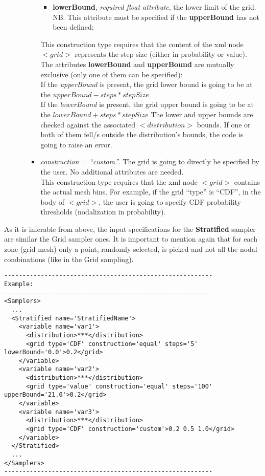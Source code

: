 \begin{itemize}
\begin{itemize}
\begin{itemize}
\begin{itemize}
         \item \textbf{lowerBound}, \textit{required float attribute}, the lower limit of the grid.
        NB. This attribute must be specified if the \textbf{upperBound} has not been defined;
      \end{itemize}
      This construction type requires that the content of the xml node $<grid>$ represents the step size (either in probability or value). The attributes \textbf{lowerBound} and \textbf{upperBound} are mutually exclusive (only one of them can be specified):
      \\ If the \textit{upperBound} is present, the grid lower bound is going to be at the $upperBound - steps*stepSize$
      \\ If the \textit{lowerBound} is present, the grid upper bound is going to be at the $lowerBound + steps*stepSize$
      The lower and upper bounds are checked against the associated $<distribution>$ bounds. If one or both of them fell/s outside the distribution's bounds, the code is going to raise an error.
  \item \textit{construction = ``custom''}. The grid is going to directly be specified by the user. No additional attributes are needed. 
     \\This construction type requires that the xml node $<grid>$  contains the actual mesh bins. For example, if the grid ``type'' is ``CDF'', in the body of $<grid>$, the user is going to specify CDF probability thresholds (nodalization in probability).
\end{itemize}
  \end{itemize}
\end{itemize}
As it is inferable from above, the input specifications for the \textbf{Stratified} sampler are similar the Grid sampler ones. It is important to mention again that for each zone (grid mesh) only a point, randomly selected, is picked and not all the nodal combinations (like in the Grid sampling).

\begin{lstlisting}[style=XML]
---------------------------------------------------------
Example:
---------------------------------------------------------
<Samplers>
  ...
  <Stratified name='StratifiedName'> 
    <variable name='var1'> 
      <distribution>***</distribution>
      <grid	type='CDF' construction='equal' steps='5' lowerBound='0.0'>0.2</grid>	
    </variable>
    <variable name='var2'> 
      <distribution>***</distribution>
      <grid	type='value' construction='equal' steps='100' upperBound='21.0'>0.2</grid>	
    </variable> 
    <variable name='var3'> 
      <distribution>***</distribution>
      <grid	type='CDF' construction='custom'>0.2 0.5 1.0</grid>	
    </variable>
  </Stratified>
  ...
</Samplers>
---------------------------------------------------------
\end{lstlisting}

